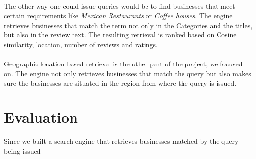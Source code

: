 \documentclass[paper=letter, fontsize=15pt]{article} %
\begin{document}
\paragraph{}The other way one could issue queries would be to find businesses that meet certain requirements like \textit{Mexican Restaurants} or \textit{Coffee houses}. The engine retrieves businesses that match the term not only in the Categories and the titles, but also in the review text. The resulting retrieval is ranked based on Cosine similarity, location, number of reviews and ratings.
\paragraph{}Geographic location based retrieval is the other part of the project, we focused on. The engine not only retrieves businesses that match the query but also makes sure the businesses are situated in the region from where the query is issued. 
\section{Evaluation}
\paragraph{}Since we built a search engine that retrieves businesses matched by the query being issued



      

\end{document}
